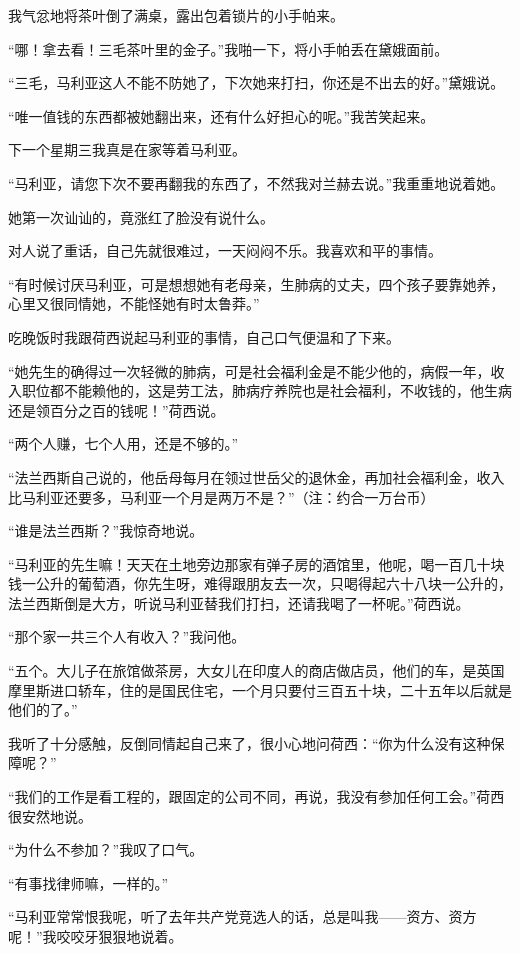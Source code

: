 \par 我气忿地将茶叶倒了满桌，露出包着锁片的小手帕来。
\par “哪！拿去看！三毛茶叶里的金子。”我啪一下，将小手帕丢在黛娥面前。
\par “三毛，马利亚这人不能不防她了，下次她来打扫，你还是不出去的好。”黛娥说。
\par “唯一值钱的东西都被她翻出来，还有什么好担心的呢。”我苦笑起来。
\par 下一个星期三我真是在家等着马利亚。
\par “马利亚，请您下次不要再翻我的东西了，不然我对兰赫去说。”我重重地说着她。
\par 她第一次讪讪的，竟涨红了脸没有说什么。
\par 对人说了重话，自己先就很难过，一天闷闷不乐。我喜欢和平的事情。
\par “有时候讨厌马利亚，可是想想她有老母亲，生肺病的丈夫，四个孩子要靠她养，心里又很同情她，不能怪她有时太鲁莽。”
\par 吃晚饭时我跟荷西说起马利亚的事情，自己口气便温和了下来。
\par “她先生的确得过一次轻微的肺病，可是社会福利金是不能少他的，病假一年，收入职位都不能赖他的，这是劳工法，肺病疗养院也是社会福利，不收钱的，他生病还是领百分之百的钱呢！”荷西说。
\par “两个人赚，七个人用，还是不够的。”
\par “法兰西斯自己说的，他岳母每月在领过世岳父的退休金，再加社会福利金，收入比马利亚还要多，马利亚一个月是两万不是？”（注：约合一万台币）
\par “谁是法兰西斯？”我惊奇地说。
\par “马利亚的先生嘛！天天在土地旁边那家有弹子房的酒馆里，他呢，喝一百几十块钱一公升的葡萄酒，你先生呀，难得跟朋友去一次，只喝得起六十八块一公升的，法兰西斯倒是大方，听说马利亚替我们打扫，还请我喝了一杯呢。”荷西说。
\par “那个家一共三个人有收入？”我问他。
\par “五个。大儿子在旅馆做茶房，大女儿在印度人的商店做店员，他们的车，是英国摩里斯进口轿车，住的是国民住宅，一个月只要付三百五十块，二十五年以后就是他们的了。”
\par 我听了十分感触，反倒同情起自己来了，很小心地问荷西：“你为什么没有这种保障呢？”
\par “我们的工作是看工程的，跟固定的公司不同，再说，我没有参加任何工会。”荷西很安然地说。
\par “为什么不参加？”我叹了口气。
\par “有事找律师嘛，一样的。”
\par “马利亚常常恨我呢，听了去年共产党竞选人的话，总是叫我——资方、资方呢！”我咬咬牙狠狠地说着。
